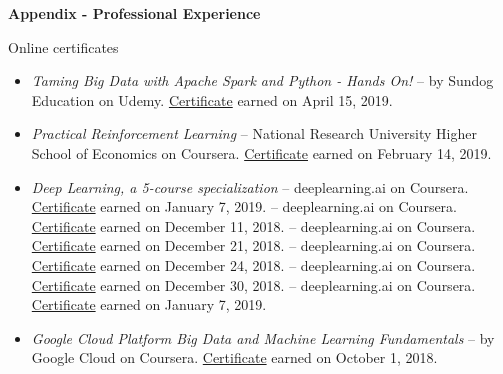\hfil{\Large{\bf Appendix - Professional Experience}}\hfil\\
\nameskip\break

\begin{rSection}{Online certificates}
  \begin{itemize}
    \item{\it Taming Big Data with Apache Spark and Python - Hands On!} -- by Sundog Education on Udemy. \href{https://www.udemy.com/certificate/UC-G53DWS5V/}{Certificate} earned on April 15, 2019.
    \item {\it Practical Reinforcement Learning} -- National Research University Higher School of Economics on Coursera. \href{https://coursera.org/share/7dbaef1de4f13d7016316a4dd7eece8a}{Certificate} earned on February 14, 2019.
    \item{\it Deep Learning, a 5-course specialization} -- deeplearning.ai on Coursera. \href{https://coursera.org/share/47b1d9ff10e34c9d26c75f5f0914379b}{Certificate} earned on January 7, 2019.
     -- deeplearning.ai on Coursera. \href{https://coursera.org/share/b99cfdbf684af876690916f62a41f74d}{Certificate} earned on December 11, 2018.
     -- deeplearning.ai on Coursera. \href{https://coursera.org/share/70436cea6ad8695c56da96f285739488}{Certificate} earned on December 21, 2018.
     -- deeplearning.ai on Coursera. \href{https://coursera.org/share/b4fec0b5c8ada28277e0369aced10c34}{Certificate} earned on December 24, 2018.
     -- deeplearning.ai on Coursera. \href{https://coursera.org/share/efaf45dddda63778f97da9aafaaa71b0}{Certificate} earned on December 30, 2018.
     -- deeplearning.ai on Coursera. \href{https://coursera.org/share/aeb503aafcd63fd9b1e098c232c6cfa4}{Certificate} earned on January 7, 2019.
    \item {\it Google Cloud Platform Big Data and Machine Learning Fundamentals} -- by Google Cloud on Coursera. \href{https://coursera.org/share/469ce1832e0392458bc6930beb44d8c6}{Certificate} earned on October 1, 2018.
  \end{itemize}
\end{rSection}

